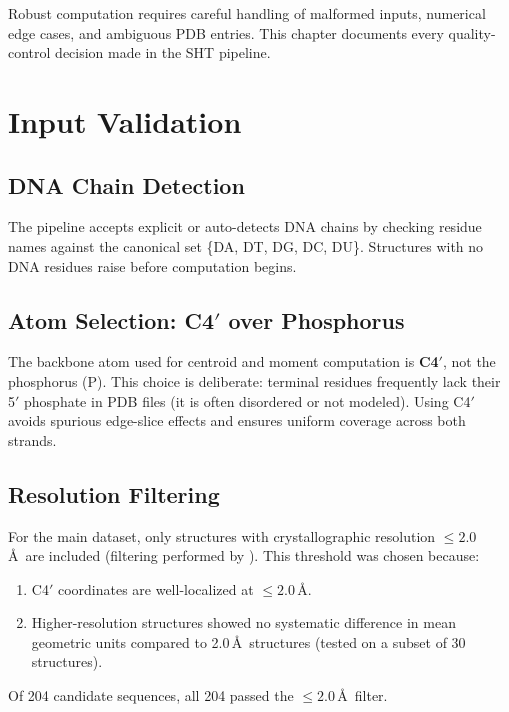 

Robust computation requires careful handling of malformed inputs, numerical edge cases, and ambiguous PDB entries. This chapter documents every quality-control decision made in the SHT pipeline.

\section{Input Validation}

\subsection{DNA Chain Detection}

The pipeline accepts explicit  or auto-detects DNA chains by checking residue names against the canonical set \{DA, DT, DG, DC, DU\}. Structures with no DNA residues raise  before computation begins.

\subsection{Atom Selection: C4$'$ over Phosphorus}

The backbone atom used for centroid and moment computation is \textbf{C4$'$}, not the phosphorus (P). This choice is deliberate: terminal residues frequently lack their 5$'$ phosphate in PDB files (it is often disordered or not modeled). Using C4$'$ avoids spurious edge-slice effects and ensures uniform coverage across both strands.

\subsection{Resolution Filtering}

For the main dataset, only structures with crystallographic resolution $\leq 2.0$\,\AA\ are included (filtering performed by ). This threshold was chosen because:
\begin{enumerate}
    \item C4$'$ coordinates are well-localized at $\leq 2.0$\,\AA.
    \item Higher-resolution structures showed no systematic difference in mean geometric units compared to 2.0\,\AA\ structures (tested on a subset of 30 structures).
\end{enumerate}
Of 204 candidate sequences, all 204 passed the $\leq 2.0$\,\AA\ filter.

